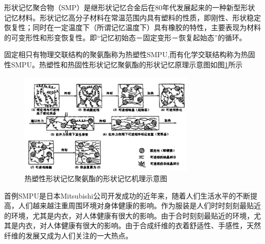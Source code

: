 

形状记忆聚合物（SMP）是继形状记忆合金后在80年代发展起来的一种新型形状记忆材料。形状记忆高分子材料在常温范围内具有塑料的性质，即刚性、形状稳定恢复性；同时在一定温度下（所谓记忆温度下）具有橡胶的特性，主要表现为材料的可变形性和形变恢复性。即“记忆初始态－固定变形－恢复起始态”的循环。

固定相只有物理交联结构的聚氨酯称为热塑性SMPU,而有化学交联结构称为热固性SMPU。热塑性和热固性形状记忆聚氨酯的形状记忆原理示意图如图\ref{fig:diagram}所示

\begin{figure}[!htp]
 \centering
 \includegraphics[width=0.75\textwidth]{figures/figure1}
 \caption{热塑性形状记忆聚氨酯的形状记忆机理示意图}\label{fig:diagram}
\end{figure}


首例SMPU是日本Mitsubishi公司开发成功的近年来，随着人们生活水平的不断提高，人们越来越注重周围环境对身体健康的影响。作为服装是人们时时刻刻最贴近的环境，尤其是内衣，对人体健康有很大的影响。由于合时刻刻最贴近的环境，尤其是内衣，对人体健康有很大的影响。由于合成纤维的衣着舒适性、手感性，天然纤维的发展又成为人们关注的一大热点。



